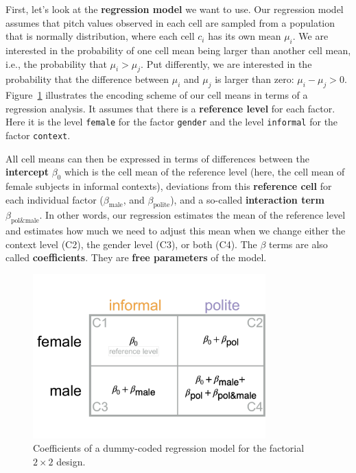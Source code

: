 \documentclass[nobib]{tufte-handout}
\newcommand{\tr}[1]{\textcolor{DarkOrange}{[tr: #1]}}
\begin{document}
First, let's look at the \textbf{regression model} we want to use.
Our regression model assumes that pitch values observed in each cell are
sampled from a population that is normally distribution, where each cell $c_i$ has its own mean $\mu_i$. We are interested in the probability of one cell mean being larger than another cell mean, i.e., the probability that $\mu_i > \mu_j$. Put differently, we are interested in the probability that the difference between $\mu_i$ and $\mu_j$ is larger than zero: $\mu_i - \mu_j > 0$.
Figure~\ref{fig:coefficients_table} illustrates the encoding scheme of our cell means in terms of a regression analysis. It assumes that
there is a \textbf{reference level} for each factor. Here it is the level \texttt{female} for
the factor \texttt{gender} and the level \texttt{informal} for the factor
\texttt{context}. 
  
All cell means can then be expressed in terms of differences between the \textbf{intercept}
$\beta_0$ which is the cell mean of the reference level (here, the cell mean of female subjects
in informal contexts), deviations from this \textbf{reference cell} for each individual factor
($\beta_{\text{male}}$, and $\beta_{\text{polite}}$), and a so-called \textbf{interaction term}
$\beta_{\text{pol\&male}}$. In other words, our regression estimates the mean of the reference
level and estimates how much we need to adjust this mean when we change either the context
level (C2), the gender level (C3), or both (C4). The $\beta$ terms are also called
\textbf{coefficients}. They are \textbf{free parameters} of the model.

\begin{figure}[]
  \centering
    \includegraphics[width = 0.8\textwidth]{pics/table_coefficients.pdf}
    \caption{Coefficients of a dummy-coded regression model for the factorial $2 \times 2$ design.}
    \label{fig:coefficients_table}
\end{figure}
\end{document}
